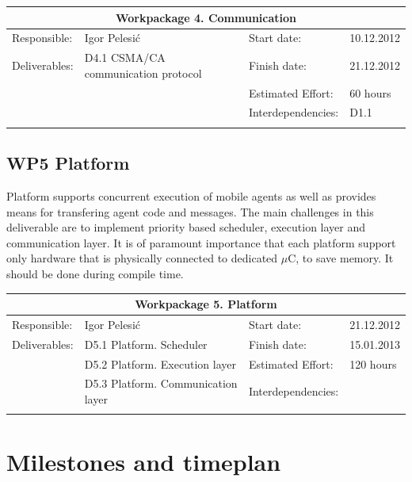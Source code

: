 \documentclass{scrreprt}
\begin{document}
\vspace{0.2in}
\begin{tabular}{|ll|ll|}
\hline \multicolumn{4}{|c|}{\textbf{Workpackage 4. Communication }}\\
\hline
Responsible:	&  Igor Pelesi\'c			& Start date:		& 10.12.2012 \\
Deliverables:	&  D4.1 CSMA/CA communication protocol	& Finish date:	 	& 21.12.2012\\
		&  					& Estimated Effort: 	& 60 hours \\
		&  					& Interdependencies:	& D1.1	\\
		&  					& 			& 	\\
\hline
\end{tabular}


	\subsection{WP5 Platform }

Platform supports concurrent execution of mobile agents as well as provides means for transfering
agent code and messages.
The main challenges in this deliverable are to implement priority based scheduler, 
execution layer and communication layer.
It is of paramount importance that each platform support only hardware that is physically connected 
to dedicated $\mu$C, to save memory. It should be done during compile time.

\vspace{0.2in}
\begin{tabular}{|ll|ll|}
\hline \multicolumn{4}{|c|}{\textbf{Workpackage 5. Platform }}\\
\hline
Responsible:	&  Igor Pelesi\'c			& Start date:		& 21.12.2012 \\
Deliverables:	&  D5.1 Platform. Scheduler		& Finish date:	 	& 15.01.2013\\
		&  D5.2 Platform. Execution layer	& Estimated Effort: 	& 120 hours \\
		&  D5.3 Platform. Communication layer	& Interdependencies:	& 	\\
		&  					& 			& 	\\
\hline
\end{tabular}


	\section{Milestones and timeplan}
\end{document}
